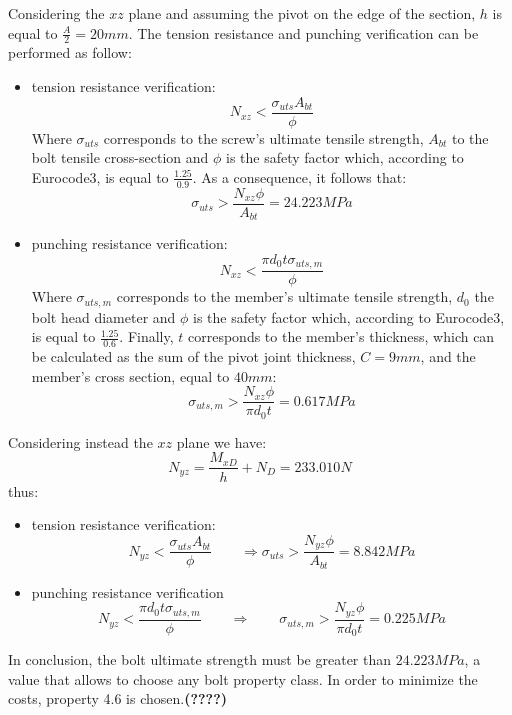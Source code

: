 Considering the $xz$ plane and assuming the pivot on the edge of the section, $h$ is equal to $\frac{A}{2} = 20 mm$. The tension resistance and punching verification can be performed as follow:
\begin{itemize}
    \item tension resistance verification:
    \begin{equation*}
        N_{xz} < \frac{\sigma_{uts}A_{bt}}{\phi}
    \end{equation*}
    Where $\sigma_{uts}$ corresponds to the screw's ultimate tensile strength, $A_{bt}$ to the bolt tensile cross-section and $\phi$ is the safety factor which, according to Eurocode3, is equal to $\frac{1.25}{0.9}$. As a consequence, it follows that:
    \begin{equation*}
       \sigma_{uts} > \frac{N_{xz}\phi}{A_{bt}} = 24.223 MPa
    \end{equation*}
    \item punching resistance verification:
    \begin{equation*}
        N_{xz} < \frac{\pi d_{0} t \sigma_{uts,m}}{\phi}
    \end{equation*}
    Where $\sigma_{uts,m}$ corresponds to the member's ultimate tensile strength, $d_{0}$ the bolt head diameter and $\phi$ is the safety factor which, according to Eurocode3, is equal to $\frac{1.25}{0.6}$. Finally, $t$ corresponds to the member's thickness, which can be calculated as the sum of the pivot joint thickness, $C = 9 mm$, and the member's cross section, equal to $40 mm$:
     \begin{equation*}
       \sigma_{uts,m} > \frac{N_{xz}\phi}{\pi d_{0}t} = 0.617 MPa
    \end{equation*}
\end{itemize}
Considering instead the $xz$ plane we have:\\
\begin{equation*}
    N_{yz} = \frac{M_{xD}}{h} + N_{D} = 233.010 N
\end{equation*}
thus:
\begin{itemize}
    \item tension resistance verification:
    \begin{equation*}
        N_{yz} < \frac{\sigma_{uts}A_{bt}}{\phi} \qquad \Rightarrow \sigma_{uts} > \frac{N_{yz}\phi}{A_{bt}} = 8.842 MPa
    \end{equation*}
    \item punching resistance verification\\
    \begin{equation*}
        N_{yz} < \frac{\pi d_{0} t \sigma_{uts,m}}{\phi} \qquad \Rightarrow \qquad   \sigma_{uts,m} > \frac{N_{yz}\phi}{\pi d_{0}t} = 0.225 MPa
    \end{equation*}
\end{itemize}
In conclusion, the bolt ultimate strength must be greater than $24.223 MPa$, a value that allows to choose any bolt property class. In order to minimize the costs, property 4.6 is chosen.\textbf{(????)} 

